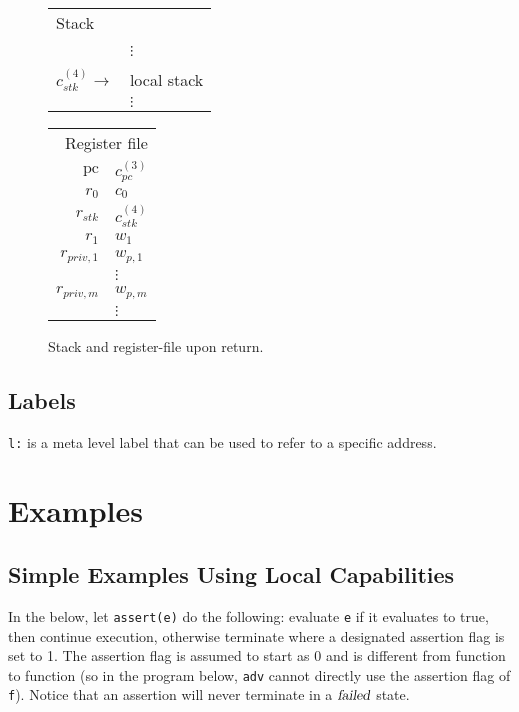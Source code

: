\documentclass[a4paper]{article}
\newcommand{\var}[1]{\mathit{#1}}
\newcommand{\pc}{\mathit{pc}}
\newcommand{\pcreg}{\mathrm{pc}}
\newcommand{\failed}{\textsl{failed}}
\begin{document}
\begin{figure}
  \label{fig:stack-after-restore-code}
  \centering
  \begin{tabular}[!h]{r | >{\raggedright\arraybackslash}p{3cm} |}
\multicolumn{2}{l}{Stack} \\
\cline{2-2}
   & \\
   & $\vdots$\\
\cline{2-2}
   & 0 \\
\cline{2-2}
$c_{\var{stk}}^{(4)} \rightarrow$   & local stack\\
   & $\vdots$\\
\cline{2-2}
\end{tabular}
\hspace{1cm}
\begin{tabular}{r | >{\centering\arraybackslash}p{0.75cm} |}
\multicolumn{2}{r}{Register file} \\
\cline{2-2}
$\pcreg$ & $c_\pc^{(3)}$\\
\cline{2-2}
$r_0$  &  $c_0$ \\
\cline{2-2}
$r_{\var{stk}}$  & $c_{\var{stk}}^{(4)}$ \\
\cline{2-2}
$r_1$ & $w_1$ \\
\cline{2-2}
$r_{\var{priv},1}$ & $w_{p,1}$\\
\cline{2-2}
& $\vdots$ \\
\cline{2-2}
$r_{\var{priv},m}$ & $w_{p,m}$ \\
\cline{2-2}
& $\vdots$ \\
\cline{2-2}
\end{tabular}
\caption{ Stack and register-file upon return. }
\end{figure}


\subsection{Labels}
\texttt{l:} is a meta level label that can be used to refer to a specific address.

\section{Examples}
\label{sec:examples}
\subsection{Simple Examples Using Local Capabilities}
\label{subsec:example-loc-cap}
In the below, let \texttt{assert(e)} do the following: evaluate \texttt{e} if it evaluates to true, then continue execution, otherwise terminate where a designated assertion flag is set to 1. The assertion flag is assumed to start as 0 and is different from function to function (so in the program below, \texttt{adv} cannot directly use the assertion flag of \texttt{f}). Notice that an assertion will never terminate in a $\failed$ state.
\end{document}
